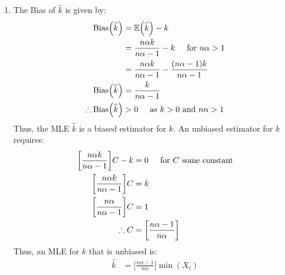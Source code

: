 \documentclass[a4paper]{article}
\newcommand{\e}{\mathbb{E}}
\newcommand{\ds}{\displaystyle}
\begin{document}
\begin{enumerate}
\begin{enumerate}
		\item The Bias of $\ds{\widehat{k}}$ is given by:
		\begin{align*}
			\text{Bias}\Big(\widehat{k}\Big) & = \e \Big(\widehat{k}\Big) - k\\
			& = \frac{n\alpha k}{n\alpha - 1} - k \hspace{5mm} \text{for } n\alpha > 1\\
			& = \frac{n\alpha k}{n\alpha - 1} - \frac{(n\alpha - 1)k}{n\alpha -1}\\
			\text{Bias}\Big(\widehat{k}\Big) & = \frac{k}{n\alpha - 1}\\
			\therefore \text{Bias}\Big(\widehat{k}\Big) & > 0 \hspace{5mm} \text{as } k > 0 \text{ and } n\alpha > 1\\
		\end{align*}
		Thus, the MLE $\ds{\widehat{k}}$ is a biased estimator for $\ds{k}$. An unbiased estimator for $\ds{k}$ requires:
		\begin{align*}
			\bigg[\frac{n\alpha k}{n\alpha - 1}\bigg]C - k & = 0 \hspace{5mm} \text{for } C \text{ some constant}\\
			\bigg[\frac{n\alpha k}{n\alpha - 1}\bigg]C & = k\\
			\bigg[\frac{n\alpha}{n\alpha - 1}\bigg]C & = 1\\
			\therefore C & = \bigg[\frac{n\alpha - 1}{n\alpha}\bigg]\\
		\end{align*}
		Thus, an MLE for $\ds{k}$ that is unbiased is:
		\begin{align*}
			\widehat{k} & = \bigg[\frac{n\alpha - 1}{n\alpha}\bigg]\min(X_i)\\
		\end{align*}

	\end{enumerate}


\end{enumerate}
\end{document}
